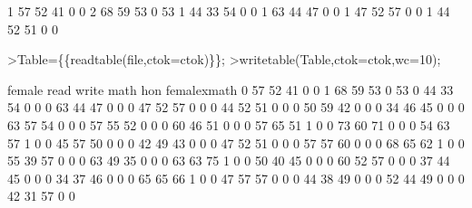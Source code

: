 \documentclass[a4paper,10pt]{article}
\begin{document}
\begin{eulernotebook}
\begin{eulercomment}
\begin{eulercomment}
\begin{eulercomment}
\begin{eulercomment}
\begin{eulercomment}
\begin{eulercomment}
\begin{eulercomment}
\begin{eulercomment}
\begin{euleroutput}
      1   57   52   41    0    0
      2   68   59   53    0   53
      1   44   33   54    0    0
      1   63   44   47    0    0
      1   47   52   57    0    0
      1   44   52   51    0    0
\end{euleroutput}
\begin{eulerprompt}
>Table=\{\{readtable(file,ctok=ctok)\}\}; 
>writetable(Table,ctok=ctok,wc=10);
\end{eulerprompt}
\begin{euleroutput}
      female      read     write      math       hon femalexmath
           0        57        52        41         0           0
           1        68        59        53         0          53
           0        44        33        54         0           0
           0        63        44        47         0           0
           0        47        52        57         0           0
           0        44        52        51         0           0
           0        50        59        42         0           0
           0        34        46        45         0           0
           0        63        57        54         0           0
           0        57        55        52         0           0
           0        60        46        51         0           0
           0        57        65        51         1           0
           0        73        60        71         0           0
           0        54        63        57         1           0
           0        45        57        50         0           0
           0        42        49        43         0           0
           0        47        52        51         0           0
           0        57        57        60         0           0
           0        68        65        62         1           0
           0        55        39        57         0           0
           0        63        49        35         0           0
           0        63        63        75         1           0
           0        50        40        45         0           0
           0        60        52        57         0           0
           0        37        44        45         0           0
           0        34        37        46         0           0
           0        65        65        66         1           0
           0        47        57        57         0           0
           0        44        38        49         0           0
           0        52        44        49         0           0
           0        42        31        57         0           0

\end{euleroutput}
\end{eulercomment}
\end{eulercomment}
\end{eulercomment}
\end{eulercomment}
\end{eulercomment}
\end{eulercomment}
\end{eulercomment}
\end{eulercomment}
\end{eulernotebook}
\end{document}
